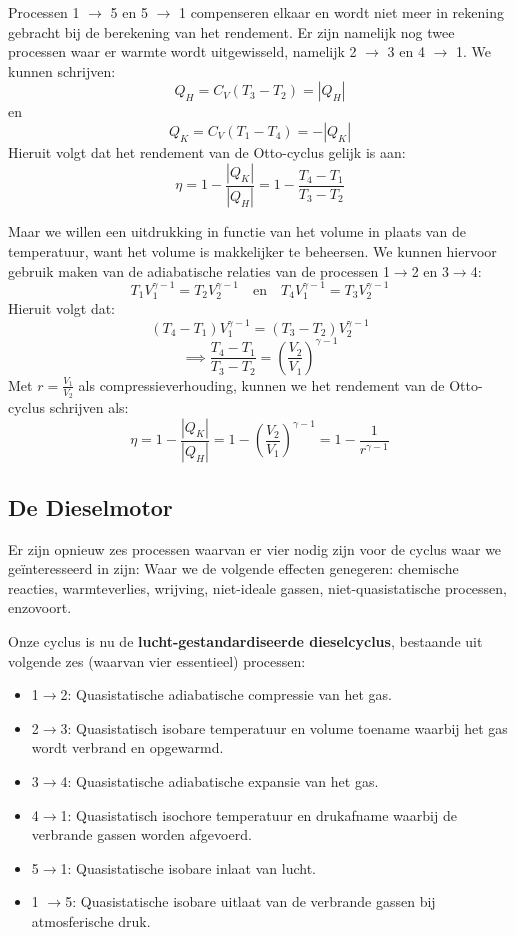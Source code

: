 Processen 1 \(\to\) 5 en 5 \(\to \) 1 compenseren elkaar en wordt niet meer in rekening gebracht bij de berekening van het rendement.
Er zijn namelijk nog twee processen waar er warmte wordt uitgewisseld, namelijk 2 \(\to\) 3 en 4 \(\to\) 1. 
We kunnen schrijven:
\[Q_H = C_V (T_3-T_2) = |Q_H|\]
en 
\[Q_K = C_V (T_1-T_4) = -|Q_K|\]
Hieruit volgt dat het rendement van de Otto-cyclus gelijk is aan: 
\[\eta = 1 - \frac{|Q_K|}{|Q_H|} = 1 - \frac{T_4-T_1}{T_3-T_2}\]

Maar we willen een uitdrukking in functie van het volume in plaats van de temperatuur, want het volume is makkelijker te beheersen.
We kunnen hiervoor gebruik maken van de adiabatische relaties van de processen 1\(\to\)2 en 3\(\to\)4:
\[T_1 V_1^{\gamma - 1} = T_2 V_2^{\gamma - 1} \quad \text{en} \quad T_4 V_1^{\gamma - 1} = T_3 V_2^{\gamma - 1}\]
Hieruit volgt dat:
\[(T_4-T_1)V_1^{\gamma - 1} = (T_3-T_2)V_2^{\gamma - 1}\]
\[\implies \frac{T_4-T_1}{T_3-T_2} = \left(\frac{V_2}{V_1}\right)^{\gamma - 1}\]
Met \(r = \frac{V_1}{V_2}\) als compressieverhouding, kunnen we het rendement van de Otto-cyclus schrijven als:
\[\eta = 1 - \frac{|Q_K|}{|Q_H|} = 1 - \left(\frac{V_2}{V_1}\right)^{\gamma - 1} = 1 - \frac{1}{r^{\gamma - 1}}\]

\subsection{De Dieselmotor}

Er zijn opnieuw zes processen waarvan er vier nodig zijn voor de cyclus waar we geïnteresseerd in zijn:
Waar we de volgende effecten genegeren: chemische reacties, warmteverlies, wrijving, niet-ideale gassen, niet-quasistatische processen, enzovoort.   

Onze cyclus is nu de \textbf{lucht-gestandardiseerde dieselcyclus}, bestaande uit volgende zes (waarvan vier essentieel) processen:
\begin{itemize}
    \item 1\(\to\)2: Quasistatische adiabatische compressie van het gas.
    \item 2\(\to\)3: Quasistatisch isobare temperatuur en volume toename waarbij het gas wordt verbrand en opgewarmd.
    \item 3\(\to\)4: Quasistatische adiabatische expansie van het gas.
    \item 4\(\to\)1: Quasistatisch isochore temperatuur en drukafname waarbij de verbrande gassen worden afgevoerd.
    \item 5\(\to\)1: Quasistatische isobare inlaat van lucht.
    \item 1 \(\to\)5: Quasistatische isobare uitlaat van de verbrande gassen bij atmosferische druk.
\end{itemize}

